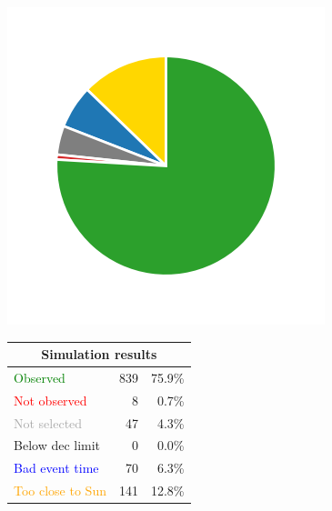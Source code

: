 \begin{colsection}
\begin{colsection}
\begin{figure}[p]
    \begin{center}
        \begin{minipage}[t]{0.2\textwidth}\vspace{10pt}
            \includegraphics[width=\linewidth]{images/gw_sims/2n8+2s8_pie.png}
        \end{minipage}
        \begin{minipage}[t]{0.37\textwidth}\vspace{0pt}
            \begin{tabular}{lrr}
                \multicolumn{3}{c}{\textbf{Simulation results}} \\
                \midrule
                \textcolor{Green}{Observed} & 839 & 75.9\% \\
                \textcolor{Red}{Not observed} & 8 & 0.7\% \\
                \textcolor{darkgray}{Not selected} & 47 & 4.3\% \\
                \textcolor{NavyBlue}{Below dec limit} & 0 & 0.0\% \\
                \textcolor{Blue}{Bad event time} & 70 & 6.3\% \\
                \textcolor{Orange}{Too close to Sun} & 141 & 12.8\% \\

\end{tabular}
\end{minipage}
\end{center}
\end{figure}
\end{colsection}
\end{colsection}
